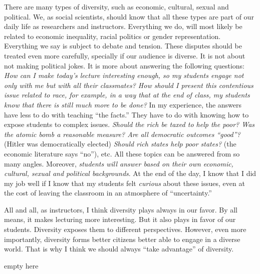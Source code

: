 \documentclass[11pt]{letter} %
\begin{document}
\begin{letter}{}
There are many types of diversity, such as economic, cultural, sexual and political. We, as social scientists, should know that all these types are part of our daily life as researchers and instructors. Everything we do, will most likely be related to economic inequality, racial politics or gender representation. Everything we say is subject to debate and tension. These disputes should be treated even more carefully, specially if our audience is diverse. It is not about not making political jokes. It is more about answering the following questions: \emph{How can I make today's lecture interesting enough, so my students engage not only with me but with all their classmates? How should I present this contentious issue related to race, for example, in a way that at the end of class, my students know that there is still much more to be done?} In my experience, the answers have less to do with teaching ``the facts.'' They have to do with knowing how to expose students to complex issues. \emph{Should the rich be taxed to help the poor? Was the atomic bomb a reasonable measure? Are all democratic outcomes ``good''?} (Hitler was democratically elected) \emph{Should rich states help poor states?} (the economic literature says ``no''), etc. All these topics can be answered from so many angles. Moreover, \emph{students will answer based on their own economic, cultural, sexual and political backgrounds}. At the end of the day, I know that I did my job well if I know that my students felt \emph{curious} about these issues, even at the cost of leaving the classroom in an atmosphere of ``uncertainty.''



All and all, as instructors, I think diversity plays always in our favor. By all means, it makes lecturing more interesting. But it also plays in favor of our  students. Diversity exposes them to different perspectives. However, even more importantly, diversity forms better citizens better able to engage in a diverse world. That is why I think we should always ``take advantage'' of diversity.



\closing{{\color{white}empty here}}




\end{letter}
\end{document}
